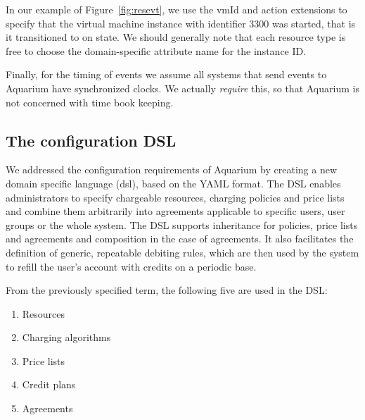 \documentclass[preprint,10pt]{sigplanconf}
\begin{document}
In our example of Figure~\ref{fig:resevt}, we use the \textsf{vmId} and \textsf{action} extensions to specify that the virtual machine instance with identifier \textsf{3300} was started, that is it transitioned to \textsf{on} state. We should generally note that each resource type is free to choose the domain-specific attribute name for the instance \textsf{ID}. 

Finally, for the timing of events we assume all systems that send events to Aquarium have synchronized clocks. We actually \textit{require} this, so that Aquarium is not concerned with time book keeping.


\subsection{The configuration DSL}
\label{sec:dsl}
We addressed the configuration requirements of Aquarium by creating a new
domain specific language ({\sc dsl}), based on the YAML format.  The DSL
enables administrators to specify chargeable resources, charging policies and
price lists and combine them arbitrarily into agreements applicable to specific
users, user groups or the whole system. 
The DSL supports inheritance for policies, price lists and agreements and composition in the case of agreements.
It also facilitates the
definition of generic, repeatable debiting rules, which are then used by the
system to refill the user's account with credits on a periodic base.

From the previously specified term, the following five are used in the DSL:

\begin{enumerate}
\item Resources
\item Charging algorithms
\item Price lists
\item Credit plans
\item Agreements
\end{enumerate}
\end{document}
